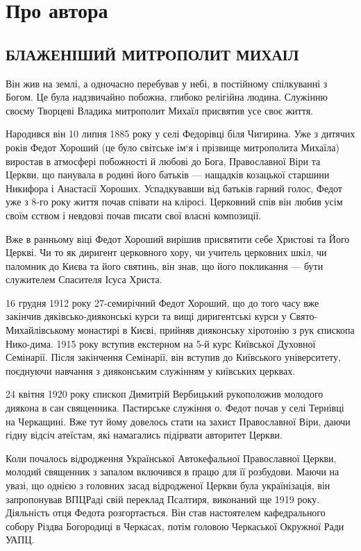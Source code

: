 \documentclass[main.tex]{subfiles}
\begin{document}
\chapter{Про автора}

\section{БЛАЖЕНІШИЙ МИТРОПОЛИТ МИХАІЛ}

Він жив на землі, а одночасно перебував у небі, в постійному спілкуванні з Богом. Це була надзвичайно побожна, глибоко релігійна людина. Служінню своєму Творцеві Владика митрополит Михаїл присвятив усе своє життя.

Народився він 10 липня 1885 року у селі Федорівці біля Чигирина. Уже з дитячих років Федот Хороший (це було світське ім`я і прізвище митрополита Михаїла) виростав в атмосфері побожності й любові до Бога, Православної Віри та Церкви, що панувала в родині його батьків — нащадків козацької старшини Никифора і Анастасії Хороших. Успадкувавши від батьків гарний голос, Федот уже з 8-го року життя почав співати на кліросі. Церковний спів він любив усім своїм єством і невдовзі почав писати свої власні композиції.

Вже в ранньому віці Федот Хороший вирішив присвятити себе Христові та Його Церкві. Чи то як диригент церковного хору, чи учитель церковних шкіл, чи паломник до Києва та його святинь, він знав, що його покликання — бути служителем Спасителя Ісуса Христа.

16 грудня 1912 року 27-семирічний Федот Хороший, що до того часу вже закінчив дяківсько-дияконські курси та вищі диригентські курси у Свято-Михайлівському монастирі в Києві, прийняв дияконську хіротонію з рук єпископа Нико-дима. 1915 року вступив екстерном на 5-й курс Київської Духовної Семінарії. Після закінчення Семінарії, він вступив до Київського університету, поєднуючи навчання з дияконським служінням у київських церквах.

24 квітня 1920 року єпископ Димитрій Вербицький рукоположив молодого диякона в сан священника. Пастирське служіння о. Федот почав у селі Тернівці на Черкащині. Вже тут йому довелось стати на захист Православної Віри, даючи гідну відсіч атеїстам, які намагались підірвати авторитет Церкви.

Коли почалось відродження Української Автокефальної Православної Церкви, молодий священник з запалом включився в працю для її розбудови. Маючи на увазі, що однією з головних засад відродженої Церкви була українізація, він запропонував ВПЦРаді свій переклад Псалтиря, виконаний ще 1919 року. Діяльність отця Федота розгортається. Він став настоятелем кафедрального собору Різдва Богородиці в Черкасах, потім головою Черкаської Окружної Ради УАПЦ.
\end{document}
